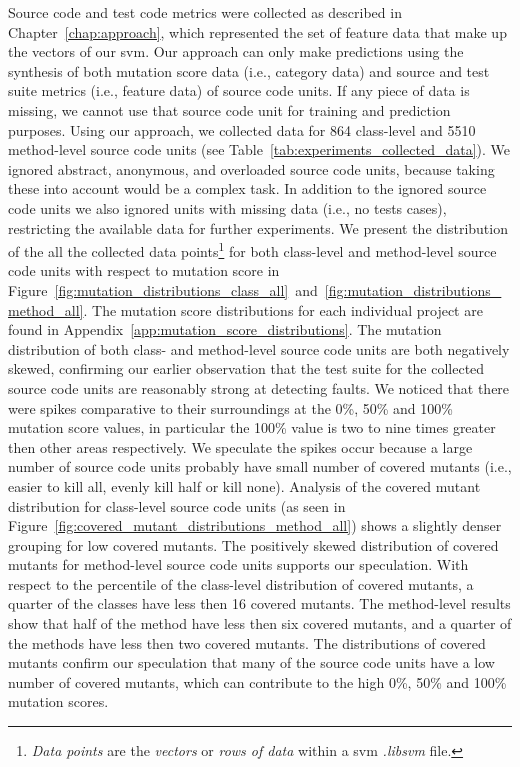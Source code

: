 Source code and test code metrics were collected as described in Chapter~\ref{chap:approach}, which represented the set of feature data that make up the vectors of our \gls{svm}. Our approach can only make predictions using the synthesis of both mutation score data (i.e., category data) and source and test suite metrics (i.e., feature data) of source code units. If any piece of data is missing, we cannot use that source code unit for training and prediction purposes. Using our approach, we collected data for 864 class-level and 5510 method-level source code units (see Table~\ref{tab:experiments_collected_data}). We ignored abstract, anonymous, and overloaded source code units, because taking these into account would be a complex task. In addition to the ignored source code units we also ignored units with missing data (i.e., no tests cases), restricting the available data for further experiments. We present the distribution of the all the collected data points\footnote{\emph{Data points} are the \emph{vectors} or \emph{rows of data} within a \gls{svm} \emph{.libsvm} file.} for both class-level and method-level source code units with respect to mutation score in Figure~\ref{fig:mutation_distributions_class_all}~and~\ref{fig:mutation_distributions_method_all}. The mutation score distributions for each individual project are found in Appendix~\ref{app:mutation_score_distributions}. The mutation distribution of both class- and method-level source code units are both negatively skewed, confirming our earlier observation that the test suite for the collected source code units are reasonably strong at detecting faults. We noticed that there were spikes comparative to their surroundings at the  0\%, 50\% and 100\% mutation score values, in particular the 100\% value is two to nine times greater then other areas respectively. We speculate the spikes occur because a large number of source code units probably have small number of covered mutants (i.e., easier to kill all, evenly kill half or kill none). Analysis of the covered mutant distribution for class-level source code units (as seen in Figure~\ref{fig:covered_mutant_distributions_method_all}) shows a slightly denser grouping for low covered mutants. The positively skewed distribution of covered mutants for method-level source code units supports our speculation. With respect to the percentile of the class-level distribution of covered mutants, a quarter of the classes have less then 16 covered mutants. The method-level results show that half of the method have less then six covered mutants, and a quarter of the methods have less then two covered mutants. The distributions of covered mutants confirm our speculation that many of the source code units have a low number of covered mutants, which can contribute to the high 0\%, 50\% and 100\% mutation scores.

